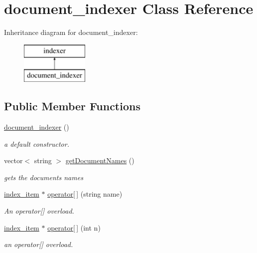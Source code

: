 \hypertarget{classdocument__indexer}{}\section{document\+\_\+indexer Class Reference}
\label{classdocument__indexer}
Inheritance diagram for document\+\_\+indexer\+:\begin{figure}[H]
\begin{center}
\leavevmode
\includegraphics[height=2.000000cm]{classdocument__indexer}
\end{center}
\end{figure}
\subsection*{Public Member Functions}
\begin{DoxyCompactItemize}
\item 
\hyperlink{classdocument__indexer_a569b5a1dc381efce6ab2ab64644a7662}{document\+\_\+indexer} ()
\begin{DoxyCompactList}\small\item\em a default constructor. \end{DoxyCompactList}\item 
vector$<$ string $>$ \hyperlink{classdocument__indexer_a885c965f69ed1fcef8b4670d48182045}{get\+Document\+Names} ()
\begin{DoxyCompactList}\small\item\em gets the documents names \end{DoxyCompactList}\item 
\hyperlink{classindex__item}{index\+\_\+item} $\ast$ \hyperlink{classdocument__indexer_a2f17781feae3360c3900190b69709f0d}{operator\mbox{[}$\,$\mbox{]}} (string name)
\begin{DoxyCompactList}\small\item\em An operator\mbox{[}\mbox{]} overload. \end{DoxyCompactList}\item 
\hyperlink{classindex__item}{index\+\_\+item} $\ast$ \hyperlink{classdocument__indexer_ab6573986790793c03f05192a526d217d}{operator\mbox{[}$\,$\mbox{]}} (int n)
\begin{DoxyCompactList}\small\item\em an operator\mbox{[}\mbox{]} overload. \end{DoxyCompactList}\end{DoxyCompactItemize}
